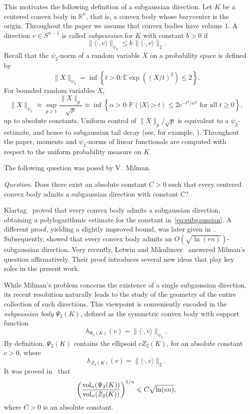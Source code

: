 \documentclass[11pt,leqno]{article}
\theoremstyle{definition}
\numberwithin{equation}{section}
\newcommand{\ls}{\leqslant}
\newcommand{\gr}{\geqslant}
\begin{document}
This motivates the following definition of a subgaussian direction. Let $K$ be a centered convex body in $\mathbb{R}^n$, that is, a convex body whose barycenter is the origin. Throughout the paper we assume that convex bodies
have volume $1$. A direction $v\in S^{n-1}$ is called {\it subgaussian} for $K$ with constant $b>0$ if
\begin{equation}\label{eq:subgaussian}\|\langle\cdot,v\rangle\|_{\psi_2}\ls b\,\|\langle\cdot,v\rangle\|_2.\end{equation}
Recall that the $\psi_2$-norm of a random variable $X$ on a probability space is defined by
\[\|X\|_{\psi_2}=\inf\left\{t>0:\mathbb E\exp\!\left((X/t)^2\right)\ls 2\right\}.\]
For bounded random variables $X$, 
\[\|X\|_{\psi_2}\approx\sup_{p\gr1}\frac{\|X\|_p}{\sqrt p}\approx\inf\left\{\alpha>0:\mathbb P(|X|>t)\ls2e^{-t^2/\alpha^2}\text{ for all }t\gr0\right\},\]
up to absolute constants. Uniform control of $\|X\|_p/\sqrt{p}$ is equivalent to a 
$\psi_2$-estimate, and hence to subgaussian tail decay (see, for example, \cite[Section~2.6]{Vershynin-book}). Throughout the paper, moments and 
$\psi_2$-norms of linear functionals are computed with respect to the uniform probability measure on $K$.

The following question was posed by V.~Milman.

\medskip

\noindent \textit{Question.} Does there exist an absolute constant $C>0$ such that every centered convex
body admits a subgaussian direction with constant $C$?

\medskip

Klartag~\cite{Klartag-2007} proved that every convex body admits a subgaussian direction, obtaining a polylogarithmic estimate for the constant in~\eqref{eq:subgaussian}. A different proof, yielding a slightly improved bound, was later given in~\cite{GPP07}. Subsequently, \cite{GPV11} showed that every convex body admits an $O(\sqrt{\ln(en)})$-subgaussian direction. Very recently, Letwin and Mikulincer~\cite{Letwin-Mikulincer-2026} answered Milman's question affirmatively. Their proof introduces several new ideas that play 
key roles in the present work.

While Milman's problem concerns the existence of a single subgaussian direction, its recent resolution naturally leads to the study of the geometry of the entire collection of such directions. This viewpoint is conveniently encoded in the \emph{subgaussian body}
$\Psi_2(K)$, defined as the symmetric convex body with support function
\[h_{\Psi_2(K)}(v)=\|\langle\cdot,v\rangle\|_{\psi_2}.\]
By definition, $\Psi_2(K)$ contains the ellipsoid $cZ_2(K)$, for an absolute constant $c>0$, where
\[h_{Z_2(K)}(v)=\|\langle\cdot,v\rangle\|_2.\]
It was proved in~\cite{GPV11} that
\[\left(\frac{{\rm vol}_n(\Psi_2(K))}{{\rm vol}_n(Z_2(K))}\right)^{1/n}\ls C\sqrt{\ln(en)},\]
where $C>0$ is an absolute constant.
\end{document}
